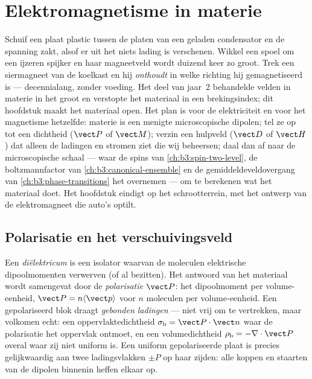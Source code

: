 \chapter{Elektromagnetisme in materie}\label{ch:b3:electromagnetism-in-matter}


Schuif een plaat plastic tussen de platen van een geladen condensator en
de spanning zakt, alsof er uit het niets lading is verschenen. Wikkel een
spoel om een ijzeren spijker en haar magneetveld wordt duizend keer zo groot.
Trek een siermagneet van de koelkast en hij \emph{onthoudt} in welke
richting hij gemagnetiseerd is --- decennialang, zonder voeding. Het deel
van jaar~2 behandelde velden in materie in het groot en verstopte het
materiaal in een brekingsindex; dit hoofdstuk maakt het materiaal open. Het
plan is voor de elektriciteit en voor het magnetisme hetzelfde: materie is
een menigte microscopische dipolen; tel ze op tot een dichtheid ($\vect P$ of $\vect M$);
verzin een hulpveld ($\vect D$ of $\vect H$) dat alleen de ladingen
en stromen ziet die wij beheersen; daal dan af naar de microscopische schaal
--- waar de spins van \cref{ch:b3:spin-two-level}, de boltzmannfactor van
\cref{ch:b3:canonical-ensemble} en de gemiddeldeveldovergang van
\cref{ch:b3:phase-transitions} het overnemen --- om te berekenen wat het
materiaal doet. Het hoofdstuk eindigt op het schrootterrein, met het ontwerp
van de elektromagneet die auto's optilt.

\section{Polarisatie en het verschuivingsveld}

\begin{definition}\label{def:b3:electromagnetism-in-matter:polarisation}
Een \emph{diëlektricum} is een isolator waarvan de moleculen elektrische
dipoolmomenten verwerven (of al bezitten). Het antwoord van het materiaal wordt
samengevat door de \emph{polarisatie} $\vect P$: het dipoolmoment
per volume-eenheid, $\vect P = n\langle\vect p\rangle$ voor $n$ moleculen
per volume-eenheid. Een gepolariseerd blok draagt \emph{gebonden ladingen} ---
niet vrij om te vertrekken, maar volkomen echt: een oppervlaktedichtheid
$\sigma_{\text{b}} = \vect P\cdot\vect n$ waar de polarisatie
het oppervlak ontmoet, en een volumedichtheid $\rho_{\text{b}} =
-\nabla\cdot\vect P$ overal waar zij niet uniform is. Een uniform
gepolariseerde plaat is precies gelijkwaardig aan twee ladingsvlakken $\pm P$
op haar zijden: alle koppen en staarten van de dipolen binnenin heffen elkaar op.
\end{definition}

